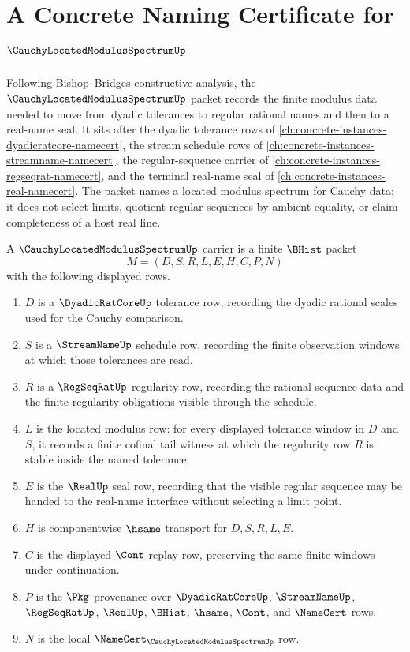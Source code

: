 \chapter{A Concrete Naming Certificate for $\CauchyLocatedModulusSpectrumUp$}
\label{ch:concrete-instances-cauchy-located-modulus-spectrum-namecert}

Following Bishop--Bridges constructive analysis, the $\CauchyLocatedModulusSpectrumUp$ packet records the finite modulus data needed to move from dyadic tolerances to regular rational names and then to a real-name seal. It sits after the dyadic tolerance rows of \autoref{ch:concrete-instances-dyadicratcore-namecert}, the stream schedule rows of \autoref{ch:concrete-instances-streamname-namecert}, the regular-sequence carrier of \autoref{ch:concrete-instances-regseqrat-namecert}, and the terminal real-name seal of \autoref{ch:concrete-instances-real-namecert}. The packet names a located modulus spectrum for Cauchy data; it does not select limits, quotient regular sequences by ambient equality, or claim completeness of a host real line.

\begin{definition}
\label{def:cauchy-located-modulus-spectrum-carrier}
A $\CauchyLocatedModulusSpectrumUp$ carrier is a finite $\BHist$ packet
$$
M=(D,S,R,L,E,H,C,P,N)
$$
with the following displayed rows.
\begin{enumerate}
\item $D$ is a $\DyadicRatCoreUp$ tolerance row, recording the dyadic rational scales used for the Cauchy comparison.
\item $S$ is a $\StreamNameUp$ schedule row, recording the finite observation windows at which those tolerances are read.
\item $R$ is a $\RegSeqRatUp$ regularity row, recording the rational sequence data and the finite regularity obligations visible through the schedule.
\item $L$ is the located modulus row: for every displayed tolerance window in $D$ and $S$, it records a finite cofinal tail witness at which the regularity row $R$ is stable inside the named tolerance.
\item $E$ is the $\RealUp$ seal row, recording that the visible regular sequence may be handed to the real-name interface without selecting a limit point.
\item $H$ is componentwise $\hsame$ transport for $D,S,R,L,E$.
\item $C$ is the displayed $\Cont$ replay row, preserving the same finite windows under continuation.
\item $P$ is the $\Pkg$ provenance over $\DyadicRatCoreUp$, $\StreamNameUp$, $\RegSeqRatUp$, $\RealUp$, $\BHist$, $\hsame$, $\Cont$, and $\NameCert$ rows.
\item $N$ is the local $\NameCert_{\CauchyLocatedModulusSpectrumUp}$ row.
\end{enumerate}
\end{definition}

